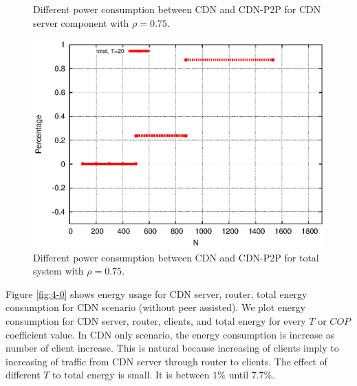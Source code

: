 \documentclass[conference]{IEEEtran}
\begin{document}
\begin{figure}[ht!]
\begin{minipage}[b]{0.4\linewidth}
	\caption{Different power consumption between CDN and CDN-P2P for CDN server component with $\rho=0.75$.}
	\label{fig:diffs1}
\end{minipage}
\hfill
\begin{minipage}[b]{0.4\linewidth}
	\includegraphics[scale=0.5]{graphs/diff-3-total.eps}
	\caption{Different power consumption between CDN and CDN-P2P for total system with $\rho=0.75$.}
	\label{fig:diffs2}
\end{minipage}
\label{fig:maindiff}
\end{figure}


Figure \ref{fig:4-0} shows energy usage for CDN server, router, total energy consumption for CDN scenario (without peer assisted).
We plot energy consumption for CDN server, router, clients, and total energy for every $T$ or $COP$ coefficient value.
In CDN only scenario, the energy consumption is increase as number of client increase.  
This is natural because increasing of clients imply to increasing of traffic from CDN server through router to clients.
The effect of different $T$ to total energy is small.  
It is between $1\%$ until $7.7\%$.
\end{document}

